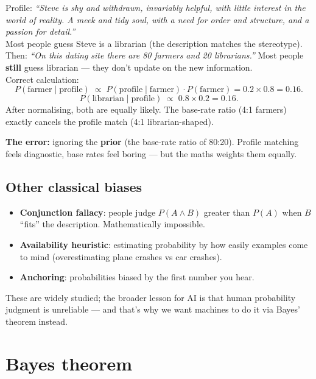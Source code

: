 \documentclass[11pt, a4paper]{article}
\begin{document}
\begin{exbox}
Profile: \emph{``Steve is shy and withdrawn, invariably helpful, with little interest in the world of reality. A meek and tidy soul, with a need for order and structure, and a passion for detail.''}\\[0.3em]
Most people guess Steve is a librarian (the description matches the stereotype).\\[0.3em]
Then: \emph{``On this dating site there are 80 farmers and 20 librarians.''} Most people \textbf{still} guess librarian — they don't update on the new information.\\[0.3em]
Correct calculation:
\[
P(\text{farmer} \mid \text{profile}) \;\propto\; P(\text{profile} \mid \text{farmer}) \cdot P(\text{farmer}) = 0.2 \times 0.8 = 0.16.
\]
\[
P(\text{librarian} \mid \text{profile}) \;\propto\; 0.8 \times 0.2 = 0.16.
\]
After normalising, both are equally likely. The base-rate ratio (4:1 farmers) exactly cancels the profile match (4:1 librarian-shaped).
\end{exbox}

\textbf{The error:} ignoring the \textbf{prior} (the base-rate ratio of 80:20). Profile matching feels diagnostic, base rates feel boring — but the maths weights them equally.

\subsection{Other classical biases}

\begin{itemize}
  \item \textbf{Conjunction fallacy}: people judge $P(A \land B)$ greater than $P(A)$ when $B$ ``fits'' the description. Mathematically impossible.
  \item \textbf{Availability heuristic}: estimating probability by how easily examples come to mind (overestimating plane crashes vs car crashes).
  \item \textbf{Anchoring}: probabilities biased by the first number you hear.
\end{itemize}

These are widely studied; the broader lesson for AI is that human probability judgment is unreliable — and that's why we want machines to do it via Bayes' theorem instead.

\section{Bayes theorem}
\end{document}
